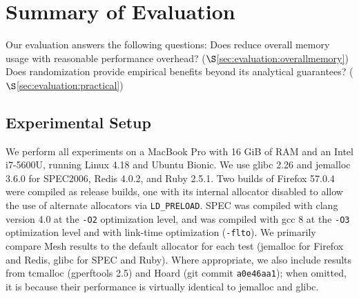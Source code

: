\section{Summary of Evaluation}
\label{sec:evaluation}


Our evaluation answers the following questions: Does \Mesh reduce
overall memory usage with reasonable performance overhead?
($\S$\ref{sec:evaluation:overallmemory}) Does randomization
provide empirical benefits beyond its analytical guarantees?
($\S$\ref{sec:evaluation:practical})




\subsection{Experimental Setup}
\label{subsec:memory-use}

We perform all experiments on a MacBook Pro with 16 GiB of RAM and an
Intel i7-5600U, running Linux 4.18 and Ubuntu Bionic. We use glibc
2.26 and jemalloc 3.6.0 for SPEC2006, Redis 4.0.2, and Ruby 2.5.1.
Two builds of Firefox 57.0.4 were compiled as release builds, one with
its internal allocator disabled to allow the use of alternate
allocators via \texttt{LD\_PRELOAD}.  SPEC was compiled with clang
version 4.0 at the \texttt{-O2} optimization level, and \Mesh was
compiled with gcc 8 at the \texttt{-O3} optimization level and with
link-time optimization (\texttt{-flto}).  We primarily compare Mesh
results to the default allocator for each test (jemalloc for Firefox
and Redis, glibc for SPEC and Ruby). Where appropriate, we also include
results from tcmalloc (gperftools 2.5) and Hoard (git commit
\texttt{a0e46aa1}); when omitted, it is because their performance is virtually identical
to jemalloc and glibc.

